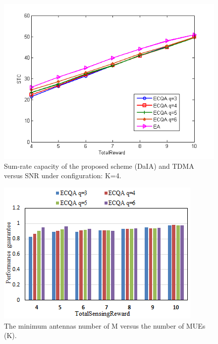\documentclass[journal]{IEEEtran}
\begin{document}
\begin{figure}[t]
	\centering
	\includegraphics[width=1\linewidth]{Fig4(e).png}
	\caption{Sum-rate capacity of the proposed scheme (DaIA) and TDMA versus SNR under configuration: K=4.}
	\label{fig:figure6}
\end{figure}
\begin{figure}[t]
	\centering
	\includegraphics[width=1\linewidth]{Fig4(f).png}
	\caption{The minimum antennas number of M versus the number of MUEs (K).}
	\label{fig:figure5}
\end{figure}
\end{document}
